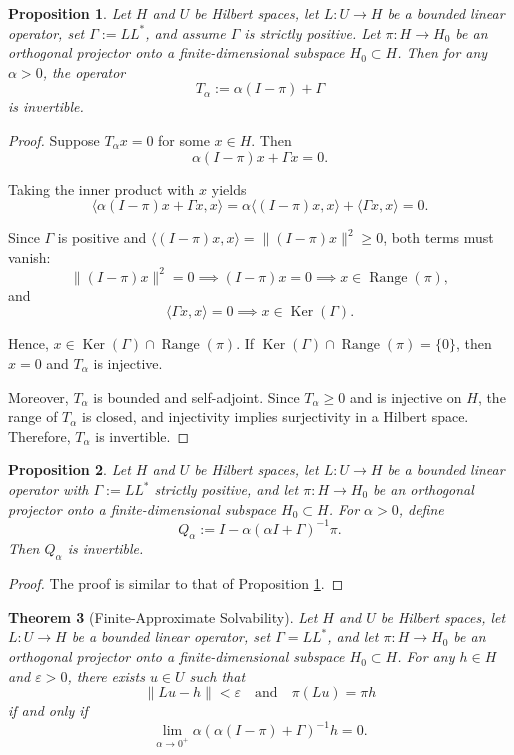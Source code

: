 \documentclass[12pt]{article}
\newtheorem{theorem}{Theorem}
\newtheorem{proposition}[theorem]{Proposition}
\DeclareMathOperator{\Range}{Range}
\DeclareMathOperator{\Ker}{Ker}
\begin{document}
	\begin{proposition} \label{prop:1}
		Let \(H\) and \(U\) be Hilbert spaces, let \(L: U \to H\) be a bounded linear operator, set \(\Gamma := L L^*\), and assume \(\Gamma\) is strictly positive. Let \(\pi: H \to H_0\) be an orthogonal projector onto a finite-dimensional subspace \(H_0 \subset H\). Then for any \(\alpha > 0\), the operator
		\[
		T_\alpha := \alpha(I-\pi) + \Gamma
		\]
		is invertible.
	\end{proposition}
	
	\begin{proof}
		Suppose \(T_\alpha x = 0\) for some \(x \in H\). Then
		\[
		\alpha (I-\pi)x + \Gamma x = 0.
		\]
		
		Taking the inner product with \(x\) yields
		\[
		\langle \alpha(I-\pi)x + \Gamma x, x \rangle = \alpha \langle (I-\pi)x, x \rangle + \langle \Gamma x, x \rangle = 0.
		\]
		
		Since \(\Gamma\) is positive and \(\langle (I-\pi)x, x \rangle = \|(I-\pi)x\|^2 \ge 0\), both terms must vanish:
		\[
		\|(I-\pi)x\|^2 = 0 \implies (I-\pi)x = 0 \implies x \in \Range(\pi),
		\]
		and
		\[
		\langle \Gamma x, x \rangle = 0 \implies x \in \Ker(\Gamma).
		\]
		
		Hence, \(x \in \Ker(\Gamma) \cap \Range(\pi)\). If \(\Ker(\Gamma) \cap \Range(\pi) = \{0\}\), then \(x = 0\) and \(T_\alpha\) is injective.
		
		Moreover, \(T_\alpha\) is bounded and self-adjoint. Since \(T_\alpha \ge 0\) and is injective on \(H\), the range of \(T_\alpha\) is closed, and injectivity implies surjectivity in a Hilbert space. Therefore, \(T_\alpha\) is invertible.
	\end{proof}
	
	\begin{proposition}
		Let \(H\) and \(U\) be Hilbert spaces, let \(L: U \to H\) be a bounded linear operator with \(\Gamma := L L^*\) strictly positive, and let \(\pi: H \to H_0\) be an orthogonal projector onto a finite-dimensional subspace \(H_0 \subset H\). For \(\alpha > 0\), define
		\[
		Q_\alpha := I - \alpha (\alpha I + \Gamma)^{-1} \pi.
		\]
		Then \(Q_\alpha\) is invertible.
	\end{proposition}
	
	\begin{proof}
		The proof is similar to that of Proposition \ref{prop:1}.
	\end{proof}
	
	\begin{theorem}[Finite-Approximate Solvability]
		Let \(H\) and \(U\) be Hilbert spaces, let \(L: U \to H\) be a bounded linear operator, set \(\Gamma = LL^*\), and let \(\pi: H \to H_0\) be an orthogonal projector onto a finite-dimensional subspace \(H_0 \subset H\). For any \(h \in H\) and \(\varepsilon > 0\), there exists \(u \in U\) such that
		\[
		\|Lu - h\| < \varepsilon \quad \text{and} \quad \pi(Lu) = \pi h
		\]
		if and only if
		\[
		\lim_{\alpha \to 0^+} \alpha (\alpha(I-\pi) + \Gamma)^{-1} h = 0.
		\]
	\end{theorem}
	
\end{document}
